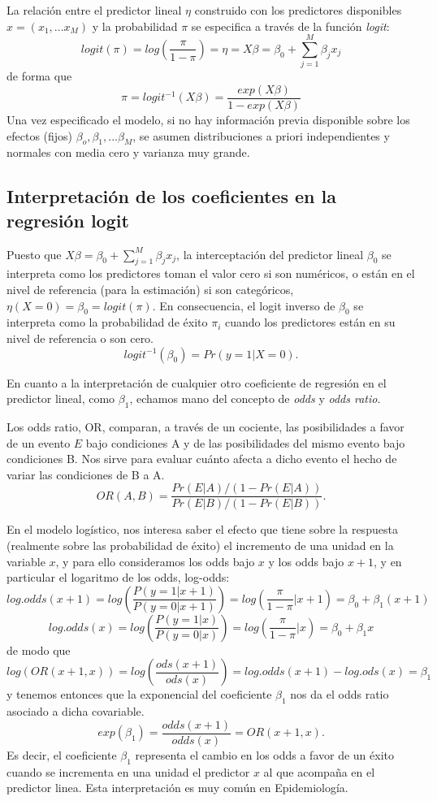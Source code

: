 \documentclass[
]{book}
\begin{document}
La relación entre el predictor lineal \(\eta\) construido con los predictores disponibles \(x=(x_{1},...x_{M})\) y la probabilidad \(\pi\) se especifica a través de la función \emph{logit}:
\[logit(\pi)=log\left(\frac{\pi}{1-\pi}\right)=\eta=X\beta=\beta_0+\sum_{j=1}^M \beta_j x_{j}\]
de forma que
\[\pi=logit^{-1}(X\beta)=\frac{exp(X\beta)}{1-exp(X\beta)}\]
Una vez especificado el modelo, si no hay información previa disponible sobre los efectos (fijos) \({\beta_o,\beta_1,...\beta_M}\), se asumen distribuciones a priori independientes y normales con media cero y varianza muy grande.

\hypertarget{interpretaciuxf3n-de-los-coeficientes-en-la-regresiuxf3n-logit}{%
\subsection*{Interpretación de los coeficientes en la regresión logit}\label{interpretaciuxf3n-de-los-coeficientes-en-la-regresiuxf3n-logit}}

Puesto que \(X\beta=\beta_0+\sum_{j=1}^M \beta_j x_{j}\), la interceptación del predictor lineal \(\beta_0\) se interpreta como los predictores toman el valor cero si son numéricos, o están en el nivel de referencia (para la estimación) si son categóricos, \(\eta(X=0)=\beta_0=logit(\pi)\). En consecuencia, el logit inverso de \(\beta_0\) se interpreta como la probabilidad de éxito \(\pi_i\) cuando los predictores están en su nivel de referencia o son cero.
\[logit^{-1}(\beta_0)=Pr(y=1|X=0).\]

En cuanto a la interpretación de cualquier otro coeficiente de regresión en el predictor lineal, como \(\beta_1\), echamos mano del concepto de \emph{odds} y \emph{odds ratio}.

Los odds ratio, OR, comparan, a través de un cociente, las posibilidades a favor de un evento \(E\) bajo condiciones A y de las posibilidades del mismo evento bajo condiciones B. Nos sirve para evaluar cuánto afecta a dicho evento el hecho de variar las condiciones de B a A.
\[OR(A,B)=\frac{Pr(E|A)/(1-Pr(E|A))}{Pr(E|B)/(1-Pr(E|B))}.\]

En el modelo logístico, nos interesa saber el efecto que tiene sobre la respuesta (realmente sobre las probabilidad de éxito) el incremento de una unidad en la variable \(x\), y para ello consideramos los odds bajo \(x\) y los odds bajo \(x+1\), y en particular el logaritmo de los odds, log-odds:
\[log.odds(x+1)=log \left( \frac{P(y=1|x+1)}{P(y=0|x+1)} \right)=log \left(\frac{\pi}{1-\pi} | x+1\right)=\beta_0+\beta_1 (x+1)\]
\[log.odds(x)=log \left(\frac{P(y=1|x)}{P(y=0|x)} \right)=log \left(\frac{\pi}{1-\pi} | x\right)=\beta_0+\beta_1 x\]
de modo que
\[log(OR(x+1,x))=log \left(\frac{ods (x+1)}{ods(x)} \right) = log.odds(x+1)-log.ods(x)= \beta_1\]
y tenemos entonces que la exponencial del coeficiente \(\beta_1\) nos da el odds ratio asociado a dicha covariable.
\[exp(\beta_1)=\frac{odds(x+1)}{odds(x)}=OR(x+1,x).\]
Es decir, el coeficiente \(\beta_1\) representa el cambio en los odds a favor de un éxito cuando se incrementa en una unidad el predictor \(x\) al que acompaña en el predictor linea. Esta interpretación es muy común en Epidemiología.
\end{document}
